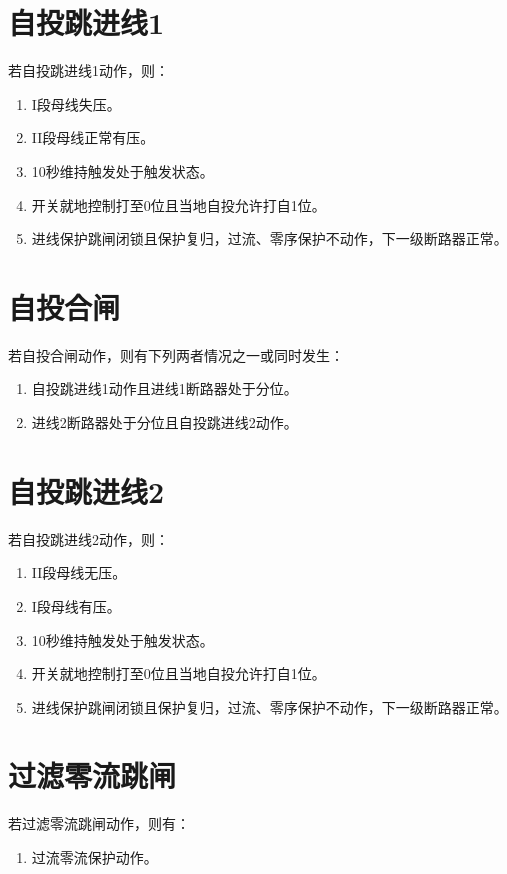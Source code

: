 \section{自投跳进线1}
若自投跳进线1动作，则：

\begin{enumerate}
	\item I段母线失压。
	\item II段母线正常有压。
	\item 10秒维持触发处于触发状态。
	\item 开关就地控制打至0位且当地自投允许打自1位。
	\item 进线保护跳闸闭锁且保护复归，过流、零序保护不动作，下一级断路器正常。
\end{enumerate}

\section{自投合闸}
若自投合闸动作，则有下列两者情况之一或同时发生：

\begin{enumerate}
	\item 自投跳进线1动作且进线1断路器处于分位。
	\item 进线2断路器处于分位且自投跳进线2动作。
\end{enumerate}

\section{自投跳进线2}
若自投跳进线2动作，则：

\begin{enumerate}
	\item II段母线无压。
	\item I段母线有压。
	\item 10秒维持触发处于触发状态。
	\item 开关就地控制打至0位且当地自投允许打自1位。
	\item 进线保护跳闸闭锁且保护复归，过流、零序保护不动作，下一级断路器正常。
\end{enumerate}

\section{过滤零流跳闸}
若过滤零流跳闸动作，则有：

\begin{enumerate}
	\item 过流零流保护动作。
\end{enumerate}

